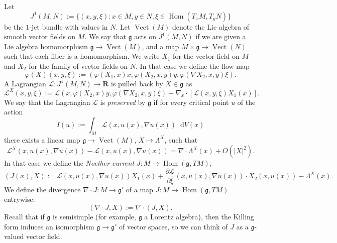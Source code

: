 \documentclass[reqno,11pt]{amsart}
\newcommand{\RR}{\mathbf{R}}
\newcommand*\dif{\mathop{}\!\mathrm{d}}
\DeclareMathOperator{\Hom}{Hom}
\DeclareMathOperator{\Vect}{Vect}
\newcommand{\Lagrange}{\mathscr L}
\newcommand{\frkg}{\mathfrak g}
\newcommand{\dfn}[1]{\emph{#1}\index{#1}}
\theoremstyle{definition}
\numberwithin{equation}{section}
\begin{document}
Let
$$J^1(M, N) := \{(x, y, \xi): x \in M, y \in N, \xi \in \Hom(T_x M, T_y N)\}$$
be the $1$-jet bundle with values in $N$.
Let $\Vect(M)$ denote the Lie algebra of smooth vector fields on $M$.
We say that $\frkg$ acts on $J^1(M, N)$ if we are given a Lie algebra homomorphism $\frkg \to \Vect(M)$, and a map $M \times \frkg \to \Vect(N)$ such that each fiber is a homomorphism.
We write $X_1$ for the vector field on $M$ and $X_2$ for the family of vector fields on $N$.
In that case we define the flow map
$$\varphi(X)(x, y, \xi) := \left(\varphi(X_1, x)x, \varphi(X_2, x, y)y, \varphi(\nabla X_2, x, y)\xi\right).$$
A Lagrangian $\Lagrange: J^1(M, N) \to \RR$ is pulled back by $X \in \frkg$ as 
$$\Lagrange^X(x, y, \xi) := \Lagrange\left(x, \varphi(X_2, x)y, \varphi(\nabla X_2, x, y)\xi\right) + \nabla_x \cdot \left[\Lagrange(x, y, \xi) X_1(x)\right].$$
We say that the Lagrangian $\Lagrange$ is \dfn{preserved} by $\frkg$ if for every critical point $u$ of the action 
$$I(u) := \int_M \Lagrange(x, u(x), \nabla u(x)) \dif V(x)$$
there exists a linear map $\frkg \to \Vect(M)$, $X \mapsto \Lambda^X$, such that 
$$\Lagrange^X(x, u(x), \nabla u(x)) - \Lagrange(x, u(x), \nabla u(x)) = \nabla \cdot \Lambda^X(x) + O(|X|^2).$$
In that case we define the \dfn{Noether current} $J: M \to \Hom(\frkg, TM)$, 
$$(J(x), X) := \Lagrange(x, u(x), \nabla u(x)) X_1(x) + \frac{\partial \Lagrange}{\partial \xi}(x, u(x), \nabla u(x)) \cdot X_2(x, u(x)) - \Lambda^X(x).$$
We define the divergence $\nabla \cdot J: M \to \frkg'$ of a map $J: M \to \Hom(\frkg, TM)$ entrywise:
$$(\nabla \cdot J, X) := \nabla \cdot (J, X).$$
Recall that if $\frkg$ is semisimple (for example, $\frkg$ a Lorentz algebra), then the Killing form induces an isomorphism $\frkg \to \frkg'$ of vector spaces, so we can think of $J$ as a $\frkg$-valued vector field.
\end{document}
